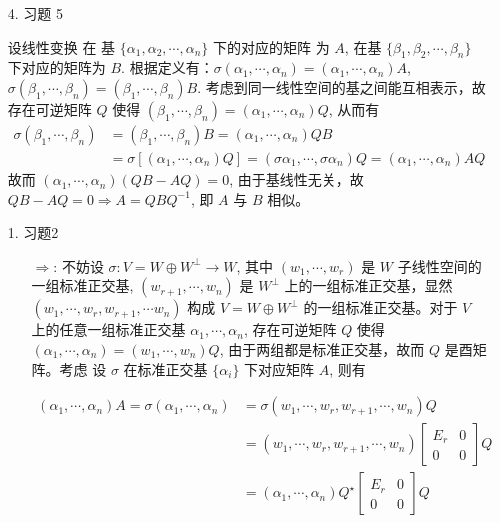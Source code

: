 \documentclass{article}
\begin{document}
\begin{spacing}{1.5}
\begin{enumerate}
    \item [4.] 习题 5
    
    设线性变换 在 基 $\{\alpha_1, \alpha_2, \cdots, \alpha_n\}$ 下的对应的矩阵 为 $A$, 在基 $\{\beta_1, \beta_2, \cdots, \beta_n\}$ 下对应的矩阵为 $B$. 根据定义有：$\sigma (\alpha_1, \cdots, \alpha_n) = (\alpha_1, \cdots, \alpha_n) A$, $\sigma (\beta_1, \cdots, \beta_n) =(\beta_1, \cdots, \beta_n) B$. 考虑到同一线性空间的基之间能互相表示，故存在可逆矩阵 $Q$ 使得 $(\beta_1, \cdots, \beta_n) = (\alpha_1, \cdots, \alpha_n)Q$, 从而有 $$\begin{array}{ll}\sigma(\beta_1, \cdots, \beta_n) &= (\beta_1, \cdots, \beta_n)B = (\alpha_1,\cdots,\alpha_n)QB\\ &= \sigma [(\alpha_1, \cdots, \alpha_n) Q] = (\sigma\alpha_1, \cdots, \sigma\alpha_n)Q = (\alpha_1,\cdots,\alpha_n) AQ\end{array}$$
    故而 $(\alpha_1, \cdots, \alpha_n) (QB - AQ) = 0$, 由于基线性无关，故 $QB - AQ = 0 \Rightarrow A = QBQ^{-1}$, 即 $A$ 与 $B$ 相似。

    \item [1.] 习题2
    
    \begin{itemize}
        \item [$\Rightarrow$:] 不妨设 $\sigma: V = W \oplus W^\perp \to W$, 其中 $(w_1, \cdots, w_r)$ 是 $W$ 子线性空间的一组标准正交基, $(w_{r+1}, \cdots, w_{n})$ 是 $W^\perp$ 上的一组标准正交基，显然 $(w_1, \cdots, w_{r}, w_{r+1}, \cdots w_n)$ 构成 $V = W\oplus W^\perp$ 的一组标准正交基。对于 $V$ 上的任意一组标准正交基 $\alpha_1, \cdots, \alpha_n$, 存在可逆矩阵 $Q$ 使得 $(\alpha_1, \cdots, \alpha_n) = (w_1, \cdots, w_n) Q$, 由于两组都是标准正交基，故而 $Q$ 是酉矩阵。考虑 设 $\sigma$ 在标准正交基 $\{\alpha_i\}$ 下对应矩阵 $A$, 则有
        
        $\begin{array}{ll}(\alpha_1, \cdots, \alpha_n) A=\sigma (\alpha_1, \cdots, \alpha_n) &= \sigma(w_1, \cdots, w_r, w_{r+1}, \cdots, w_n) Q \\&= (w_1, \cdots, w_r, w_{r+1}, \cdots, w_n) \left[\begin{array}{cc}E_r&0\\0&0\end{array}\right]Q\\&=(\alpha_1, \cdots, \alpha_n)Q^\star \left[\begin{array}{cc}E_r&0\\0&0\end{array}\right]Q\end{array}$


\end{itemize}
\end{enumerate}
\end{spacing}
\end{document}
